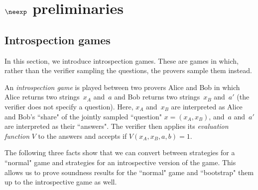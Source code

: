 \section{$\neexp$ preliminaries}

\subsection{Introspection games}

In this section, we introduce introspection games.
These are games in which, rather than the verifier sampling the questions,
the provers sample them instead.

\begin{definition}
An \emph{introspection game} is played between two provers Alice and Bob
in which Alice returns two strings~$x_A$ and~$a$
and Bob returns two strings~$x_B$ and~$a'$ (the verifier does not specify a question).
Here, $x_A$ and~$x_B$ are interpreted as Alice and Bob's ``share" of the jointly sampled ``question" $x = (x_A, x_B)$,
and~$a$ and~$a'$ are interpreted as their ``answers".
The verifier then applies its \emph{evaluation function} $V$ to the answers
and accepts if $V(x_A, x_B, a, b)=1$.
\end{definition}

The following three facts show that we can convert between strategies for a ``normal" game and strategies for an introspective version of the game.
This allows us to prove soundness results for the ``normal" game and ``bootstrap" them up to the introspective game as well.

